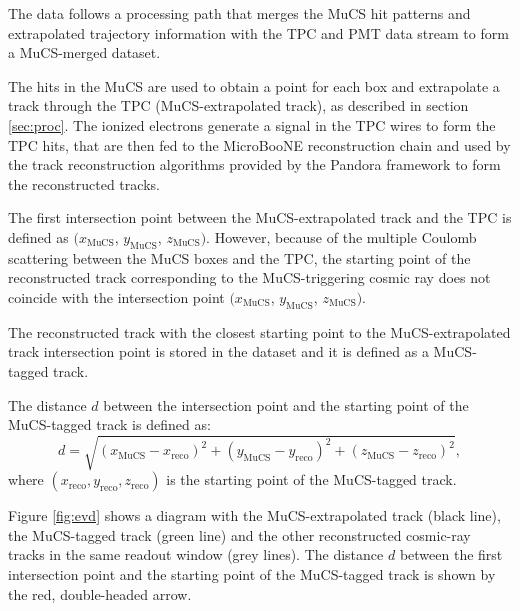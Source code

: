 \documentclass[a4paper,11pt]{article}
\begin{document}
The data follows a processing path that merges the MuCS hit patterns and extrapolated trajectory information with the TPC and PMT data stream to form a MuCS-merged dataset. %


The hits in the MuCS are used to obtain a point for each box and extrapolate a track through the TPC (MuCS-extrapolated track), as described in section \ref{sec:proc}. The ionized electrons generate a signal in the TPC wires to form the TPC hits, that are then fed to the MicroBooNE reconstruction chain and used by the track reconstruction algorithms provided by the Pandora framework \cite{pandora} to form the reconstructed tracks.

The first intersection point between the MuCS-extrapolated track and the TPC is defined as $(x_{\mathrm{MuCS}}$, $y_{\mathrm{MuCS}}$, $z_{\mathrm{MuCS}})$. However, because of the multiple Coulomb scattering between the MuCS boxes and the TPC, the starting point of the reconstructed track corresponding to the MuCS-triggering cosmic ray does not coincide with the intersection point $(x_{\mathrm{MuCS}}$, $y_{\mathrm{MuCS}}$, $z_{\mathrm{MuCS}})$.

The reconstructed track with the closest starting point to the MuCS-extrapolated track intersection point is stored in the dataset and it is defined as a MuCS-tagged track.

The distance $d$ between the intersection point and the starting point of the MuCS-tagged track is defined as:
\begin{equation}\label{eq:d}
d = \sqrt{(x_{\mathrm{MuCS}}-x_{\mathrm{reco}})^2+(y_{\mathrm{MuCS}}-y_{\mathrm{reco}})^2+(z_{\mathrm{MuCS}}-z_{\mathrm{reco}})^2},
\end{equation}
where $(x_{\mathrm{reco}},y_{\mathrm{reco}},z_{\mathrm{reco}})$ is the starting point of the MuCS-tagged track.

Figure \ref{fig:evd} shows a diagram with the MuCS-extrapolated track (black line), the MuCS-tagged track (green line) and the other reconstructed cosmic-ray tracks in the same readout window (grey lines). The distance $d$ between the first intersection point and the starting point of the MuCS-tagged track is shown by the red, double-headed arrow.
\end{document}
